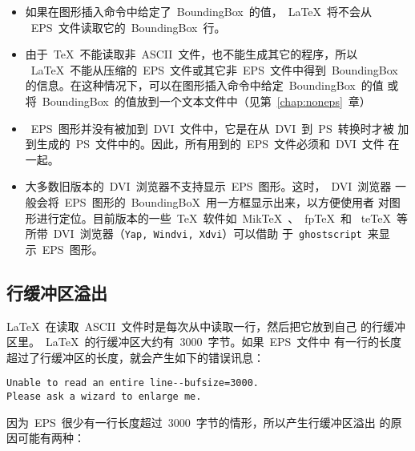 \begin{itemize}
	\item 如果在图形插入命令中给定了~BoundingBox~的值，~\LaTeX{}~将不会从
	~EPS~文件读取它的~BoundingBox~行。
	\item 由于~\TeX{}~不能读取非~ASCII~文件，也不能生成其它的程序，所以
	~\LaTeX{}~不能从压缩的~EPS~文件或其它非~EPS~文件中得到~BoundingBox~
	的信息。在这种情况下，可以在图形插入命令中给定~BoundingBox~的值
	或将~BoundingBox~的值放到一个文本文件中（见第~\ref{chap:noneps}~章）
	\item ~EPS~图形并没有被加到~DVI~文件中，它是在从~DVI~到~PS~转换时才被
	加到生成的~PS~文件中的。因此，所有用到的~EPS~文件必须和~DVI~文件
	在一起。
	\item 大多数旧版本的~DVI~浏览器不支持显示~EPS~图形。这时，~DVI~浏览器
	一般会将~EPS~图形的~BoundingBoX~用一方框显示出来，以方便使用者
	对图形进行定位。目前版本的一些~TeX~软件如~Mik\TeX{}~、~fp\TeX{}~和
	~te\TeX{}~等所带~DVI~浏览器（\texttt{Yap, Windvi, Xdvi}）可以借助
	于~\texttt{ghostscript}~来显示~EPS~图形。
\end{itemize}

\subsection[行缓冲区溢出]{行缓冲区溢出}\label{ssec:linebuffer}

\LaTeX{}~在读取~ASCII~文件时是每次从中读取一行，然后把它放到自己
的行缓冲区里。~\LaTeX{}~的行缓冲区大约有~3000~字节。如果~EPS~文件中
有一行的长度超过了行缓冲区的长度，就会产生如下的错误讯息：

\begin{Verbatim}[xleftmargin=22pt]
Unable to read an entire line--bufsize=3000.
Please ask a wizard to enlarge me.
\end{Verbatim}

因为~EPS~很少有一行长度超过~3000~字节的情形，所以产生行缓冲区溢出
的原因可能有两种：

